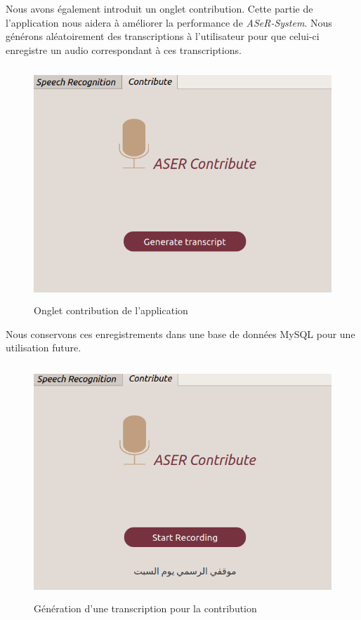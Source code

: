 Nous avons également introduit un onglet contribution. Cette partie de l'application nous aidera à améliorer la performance de \textit{ASeR-System}. Nous générons aléatoirement des transcriptions à l'utilisateur pour que celui-ci enregistre un audio correspondant à ces transcriptions.

\begin{figure}[H]
     \centering
     \includegraphics[height=250pt,width=430pt]{images/chap4/main_contribute.png}
     \caption{Onglet contribution de l'application}
     \label{}
 \end{figure}

Nous conservons ces enregistrements dans une base de données MySQL pour une utilisation future. 
 
 \begin{figure}[H]
     \centering
     \includegraphics[height=250pt,width=430pt]{images/chap4/record_contribute.png}
     \caption{Génération d'une transcription pour la contribution}
     \label{}
 \end{figure}
 
